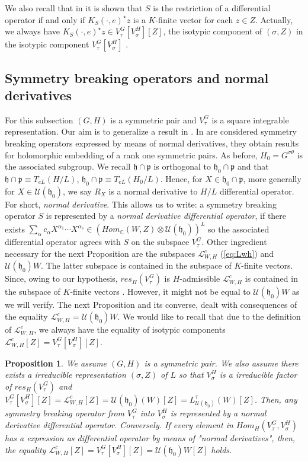 \documentclass[12pt]{amsart}
\newtheorem{prop}[thm]{Proposition}
\theoremstyle{definition}
\theoremstyle{remark}
\newcommand{\h}{\mathfrak{h}}
\newcommand{\C}{{\mathbb C}}
\numberwithin{equation}{section}
\begin{document}
   We also recall that in \cite[Lemma 4.2]{OV2} it is shown that $S$ is the restriction of a differential operator if and only if $K_S(\cdot,e)^\star z$ is a $K$-finite vector for each $z\in Z$. Actually, we always have $K_S(\cdot,e)^\star z \in V_\tau^G[V_\sigma^H][Z]$, the isotypic component of $(\sigma,Z)$ in the isotypic component $V_\tau^G[V_\sigma^H]$ \cite{OV4}.

  \subsection{Symmetry breaking operators and  normal derivatives} For this subsection $(G,H)$ is a symmetric pair and $V_\tau^G$ is a   square integrable representation. Our aim is to generalize a result  in   \cite[Theorem 5.1]{Na}. In \cite{KP2} are considered symmetry breaking operators expressed by means of normal derivatives, they obtain results for holomorphic embedding of a rank one symmetric pairs.   As before, $H_0=G^{\sigma \theta}$ is the associated subgroup. We recall $\mathfrak h\cap \mathfrak p$ is orthogonal to $\mathfrak h_0\cap \mathfrak p$ and that $\mathfrak h\cap \mathfrak p\equiv T_{eL}(H/L)$, $\mathfrak h_0\cap \mathfrak p\equiv T_{eL}(H_0/L)$. Hence, for $X \in \mathfrak h_0\cap \mathfrak p$, more generally for $X \in \mathcal U(\mathfrak h_0)$, we say $R_X$ is a normal derivative  to $H/L$ differential operator. For short, {\it normal derivative}.  This allows us to write: a symmetry breaking operator $S$ is represented by a {\it normal derivative differential operator}, if there exists $\sum_\alpha c_\alpha X^{\alpha_1}\cdots X^{\alpha_s}\in (Hom_\C(W,Z)\otimes \mathcal U(\h_0))^L$ so the associated differential operator agrees with $S $ on the subspace $V_\tau^G$. Other ingredient necessary for the next Proposition are the subspaces $\mathcal L_{W,H}^c$ (\ref{eq:Lwh}) and $\mathcal U(\mathfrak h_0)W$. The latter subspace is contained in the subspace of $K$-finite vectors. Since, owing to our hypothesis, $res_H(V_\tau^G)$ is $H$-admissible $\mathcal L_{W,H}^c$ is contained in the subspace of $K$-finite vectors \cite[Prop 1.6]{Kobdd3}. However, it might not be equal to $\mathcal U(\mathfrak h_0)W$ as we will verify. The next Proposition and its converse, dealt with consequences of the equality $\mathcal L_{W,H}^c = \mathcal U(\mathfrak h_0)W$. We would like to recall that due to the definition of $\mathcal L_{W,H}^c $, we always have the equality of isotypic components $\mathcal L_{W,H}^c [Z]=  V_\tau^G[V_\sigma^H][Z]$.
\begin{prop}\cite[Proposition 5]{OV3} We assume $(G,H)$ is a symmetric pair.  We also assume there exists a irreducible representation $(\sigma, Z)$ of $L$ so that $V_\sigma^H$ is a irreducible factor of $res_H(V_\tau^G)$ and  $ V_\tau^G[V_\sigma^H][Z]=\mathcal L_{W,H}^c[Z]= \mathcal U(\mathfrak h_0)(W)[Z]=L_{\mathcal U(\mathfrak h_0) }^\tau( W)[Z]$. Then,   any symmetry breaking operator from $V_\tau^G$ into $V_\sigma^H $ is represented by a normal derivative  differential operator. Conversely.  If every element
 in $Hom_H(V_\tau^G, V_\sigma^H) $ has a expression as differential operator by means of "normal derivatives",  then, the equality  $\mathcal L_{W,H}^c[Z]= V_\tau^G[V_\sigma^H][Z]=\mathcal U(\mathfrak h_0)W[Z]$ holds.
\end{prop}
\end{document}
